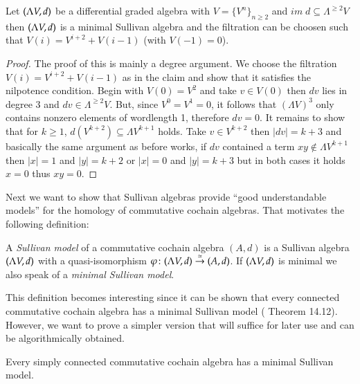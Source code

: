 \begin{Proposition}
\label{prop:WellBehavedFiltrations}
 Let $(\Lambda V,d)$ be a differential graded algebra with $V = {\lbrace V^n \rbrace}_{n \geq 2}$ and 
 ${im \;d \subseteq \Lambda^{\geq 2} V}$ then $(\Lambda V,d)$ is a minimal Sullivan algebra and
 the filtration can be choosen such that $V(i) = V^{i+2} + V(i-1)$ (with $V(-1) = 0$).
\end{Proposition}
\begin{proof}
 The proof of this is mainly a degree argument. We choose the filtration ${V(i) = V^{i+2} + V(i-1)}$ as in the claim
 and show that it satisfies
 the nilpotence condition. Begin with $V(0) = V^2$ and take $v \in V(0)$ then $dv$ lies in
 degree $3$ and $dv \in \Lambda^{\geq 2} V$. But, since $V^0 = V^1 = 0$, it follows that $(\Lambda V)^3$ only contains 
 nonzero elements of wordlength 1, therefore $dv = 0$. 
 It remains to show that for $k \geq 1$, $d(V^{k+2}) \subseteq \Lambda V^{k+1}$ holds. Take $v \in V^{k+2}$ then 
 $| dv | = k + 3$ and basically the same argument as before works, if $dv$ contained a term $xy \notin \Lambda V^{k+1}$
 then $|x| = 1$ and $|y| = k + 2$ or $|x| = 0$ and $|y| = k + 3$ but in both cases it holds $x = 0$ thus $xy = 0$.
\end{proof}




Next we want to show that Sullivan algebras provide ``good understandable models'' for the homology of commutative cochain algebras. That motivates
the following definition:

\begin{Definition}
  A \emph{Sullivan model} of a commutative cochain algebra $(A,d)$ is a Sullivan algebra $(\Lambda V,d)$ with a quasi-isomorphism
  $\varphi \colon (\Lambda V,d) \overset{\simeq}{\to} (A,d)$. If $(\Lambda V,d)$ is minimal we also speak of a 
  \emph{minimal Sullivan model}.
\end{Definition}

\begin{Remark}
\label{rem:MinimalSullivanModelsExist}
This definition becomes interesting since it can be shown that every connected commutative cochain algebra has a minimal Sullivan model
(\cite{Felix2001} Theorem 14.12). However, we want to prove a simpler version that will suffice for later use and can
be algorithmically obtained.
\end{Remark}

\begin{Theorem}
 \label{thm:MinimalSullivanModelsExistForSimplyConnected}
 Every simply connected commutative cochain algebra has a minimal Sullivan model.
\end{Theorem}

